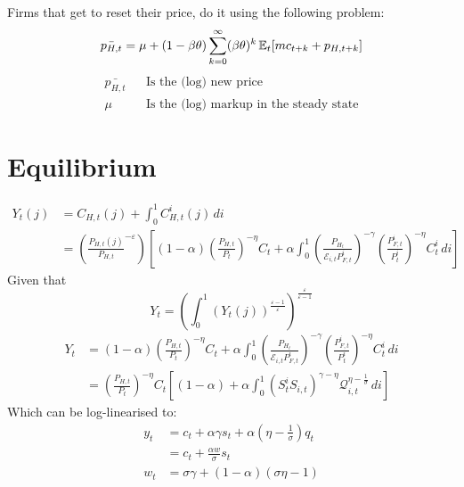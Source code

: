 \documentclass[12pt]{article}
\begin{document}
Firms that get to reset their price, do it using the following problem:
\begin{equation}
    \bar{p_{H,t}} = \mu + (1-\beta \theta) \sum_{k=0}^{\infty} (\beta \theta)^{k} \operatorname{\mathbb{E}}_t [mc_{t+k} + p_{H,t+k}]
\end{equation}
\begin{align}
    \bar{p_{H,t}} &  & \text{Is the (log) new price}                  \\
    \mu           &  & \text{Is the (log) markup in the steady state}
\end{align}
\section{Equilibrium}
\begin{align}
    Y_t(j) & = C_{H,t}(j) + \int_{0}^{1} C_{H,t}^i (j) \, di                                                                                                                                                                                                                                      \\
           & =\left(\frac{P_{H,t}(j)}{P_{H,t}}^{-\varepsilon}\right) \left[ (1-\alpha) \left(\frac{P_{H,t}}{P_t} \right)^{-\eta} C_t + \alpha \int_{0}^{1} \left( \frac{P_{H_t}}{\mathcal{E}_{i,t}P_{F,t}^i}\right)^{-\gamma} \left(\frac{P_{F,t}^i}{P_t^i} \right)^{-\eta} C_{t}^i \, di \right]
\end{align}
Given that
\begin{equation}
    Y_t = \left( \int_{0}^{1} (Y_t(j))^{\frac{\varepsilon-1}{\varepsilon}}\right)^{\frac{\varepsilon}{\varepsilon-1}}
\end{equation}
\begin{align}
    Y_t & = (1-\alpha) \left(\frac{P_{H,t}}{P_t} \right)^{-\eta} C_t + \alpha \int_{0}^{1} \left( \frac{P_{H_t}}{\mathcal{E}_{i,t}P_{F,t}^i}\right)^{-\gamma} \left(\frac{P_{F,t}^i}{P_t^i} \right)^{-\eta} C_{t}^i \, di \\
        & = \left(\frac{P_{H,t}}{P_t}\right)^{-\eta}C_t \left[ (1-\alpha) + \alpha \int_{0}^{1} (S_t^i S_{i,t})^{\gamma - \eta} \mathcal{Q}_{i,t}^{\eta - \frac{1}{\sigma}} \, di \right]
\end{align}
Which can be log-linearised to:
\begin{align}
    y_t & = c_t + \alpha \gamma s_t + \alpha(\eta - \frac{1}{\sigma})q_t \\
        & = c_t + \frac{\alpha w}{\sigma}s_t                             \\
    w_t & = \sigma \gamma + (1-\alpha)(\sigma \eta - 1)
\end{align}
\end{document}
